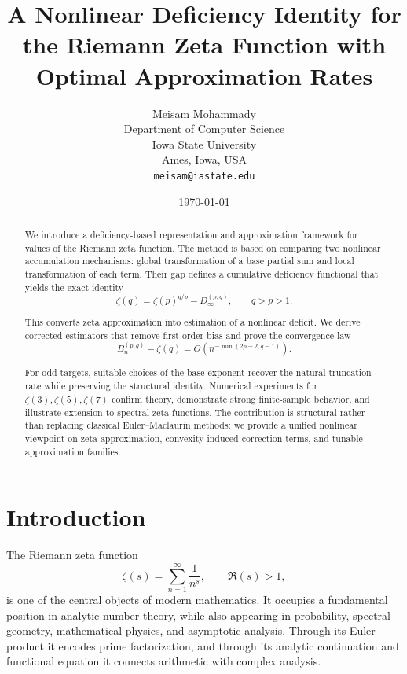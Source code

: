 \documentclass[11pt]{article}
\title{\bfseries A Nonlinear Deficiency Identity for the Riemann Zeta Function with Optimal Approximation Rates}
\author{
Meisam Mohammady\\[4pt]
Department of Computer Science\\
Iowa State University\\
Ames, Iowa, USA\\
\texttt{meisam@iastate.edu}
}
\date{\today}
\numberwithin{equation}{section}
\theoremstyle{definition}
\begin{document}
\maketitle


\begin{abstract}
We introduce a deficiency-based representation and approximation framework for values of the Riemann zeta function. The method is based on comparing two nonlinear accumulation mechanisms: global transformation of a base partial sum and local transformation of each term. Their gap defines a cumulative deficiency functional that yields the exact identity
\[
\zeta(q)=\zeta(p)^{q/p}-D_{\infty}^{(p,q)}, \qquad q>p>1.
\]

This converts zeta approximation into estimation of a nonlinear deficit. We derive corrected estimators that remove first-order bias and prove the convergence law
\[
B_n^{(p,q)}-\zeta(q)=O\!\left(n^{-\min(2p-2,q-1)}\right).
\]

For odd targets, suitable choices of the base exponent recover the natural truncation rate while preserving the structural identity. Numerical experiments for $\zeta(3),\zeta(5),\zeta(7)$ confirm theory, demonstrate strong finite-sample behavior, and illustrate extension to spectral zeta functions. The contribution is structural rather than replacing classical Euler--Maclaurin methods: we provide a unified nonlinear viewpoint on zeta approximation, convexity-induced correction terms, and tunable approximation families.
\end{abstract}
\maketitle
\section{Introduction}

The Riemann zeta function
\[
\zeta(s)=\sum_{n=1}^{\infty}\frac{1}{n^s},
\qquad \Re(s)>1,
\]
is one of the central objects of modern mathematics. It occupies a fundamental position in analytic number theory, while also appearing in probability, spectral geometry, mathematical physics, and asymptotic analysis. Through its Euler product it encodes prime factorization, and through its analytic continuation and functional equation it connects arithmetic with complex analysis.
\end{document}
